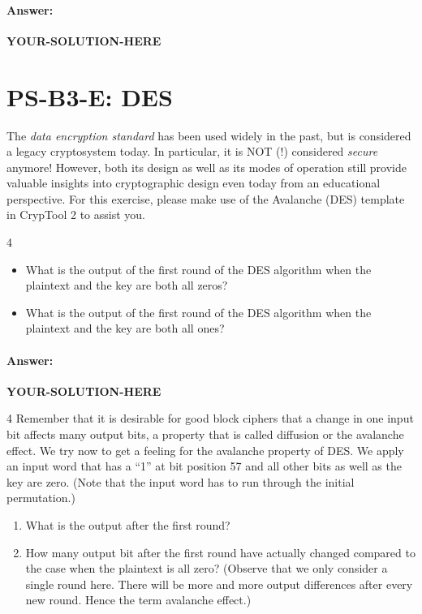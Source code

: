 \documentclass[]{scrartcl}
\newcounter{exercise}
\newcounter{qid}[section]
\newcommand{\exerciseprefix}{prefix}
\newcommand{\questiontitle}{Questions}
\newcommand{\blockid}{B3}
\newcommand{\exname}{}
\newcommand{\yoursolutionhere}{\textbf{YOUR-SOLUTION-HERE}}
\begin{document}
\paragraph{Answer:} \yoursolutionhere{}


\pagebreak
{}
\renewcommand{\exname}{DES}
\section*{PS-\blockid{}-E\theexercise: DES}
The \emph{data encryption standard} has been used widely in the past, but is considered a legacy cryptosystem today. In particular, it is NOT (!) considered \emph{secure} anymore! However, both its design as well as its modes of operation still provide valuable insights into cryptographic design even today from an educational perspective. For this exercise, please make use of the Avalanche (DES) template in CrypTool 2 to assist you. 


\renewcommand{\exerciseprefix}{PS-\blockid{}-E\theexercise: \exname-Q\theqid}
\renewcommand{\questiontitle}{\exerciseprefix{}: Mechanics of bit manipulation in DES}
\begin{exercisebox}{4}
\begin{itemize}
 \item  What is the output of the first round of the DES algorithm when the plaintext
and the key are both all zeros?
 \item  What is the output of the first round of the DES algorithm when the plaintext
and the key are both all ones?
\end{itemize}

\end{exercisebox}

\paragraph{Answer:} \yoursolutionhere{}



\renewcommand{\exerciseprefix}{PS-\blockid{}-E\theexercise: \exname-Q\theqid}
\renewcommand{\questiontitle}{\exerciseprefix{}: Avalanche effect in DES}
\begin{exercisebox}{4}
Remember that it is desirable for good block ciphers that a change in one input
bit affects many output bits, a property that is called diffusion or the avalanche
effect. We try now to get a feeling for the avalanche property of DES. We apply an
input word that has a “1” at bit position 57 and all other bits as well as the key are
zero. (Note that the input word has to run through the initial permutation.)
\begin{enumerate}
\item What is the output after the first round?
\item How many output bit after the first round have actually changed compared to
the case when the plaintext is all zero? (Observe that we only consider a single
round here. There will be more and more output differences after every new
round. Hence the term avalanche effect.)
\end{enumerate}
\end{exercisebox}
\end{document}
